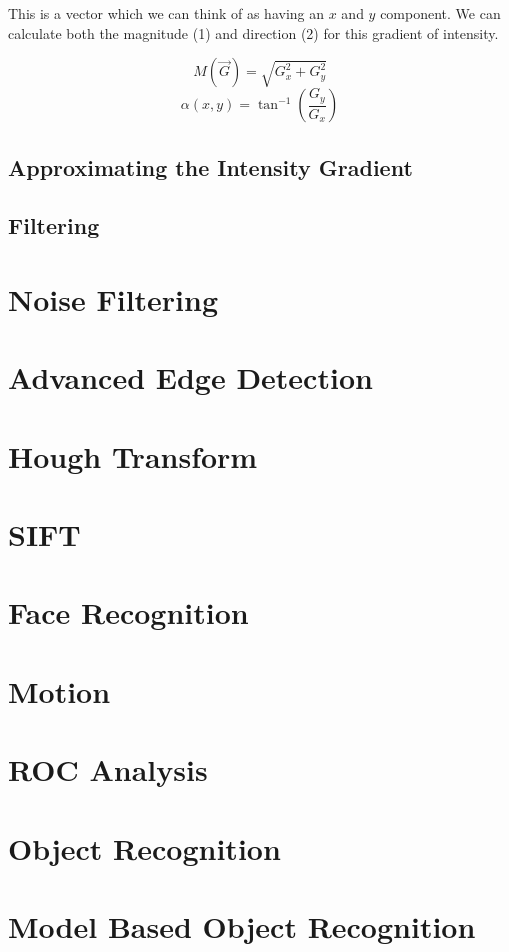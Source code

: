 \documentclass{article}
\begin{document}
	 This is a vector which we can think of as having an $x$ and $y$ component. We can calculate both the magnitude (1) and direction (2) for this gradient of intensity. 
	\begin{multicols}{2}
		\noindent
		\begin{equation}
			M(\overrightarrow{G}) = \sqrt{G_{x}^{2} + G_{y}^{2}}
		\end{equation}
		\begin{equation}
			\alpha(x, y) = \tan^{-1}\left(\frac{G_y}{G_x}\right)
		\end{equation}
	\end{multicols}
	
	\subsection{Approximating the Intensity Gradient}
	
	\subsection{Filtering}
	
	\section{Noise Filtering}

	\section{Advanced Edge Detection}

	\section{Hough Transform}

	\section{SIFT}

	\section{Face Recognition}

	\section{Motion}

	\section{ROC Analysis}

	\section{Object Recognition}

	\section{Model Based Object Recognition}
	\newpage
	\listoffigures
	\printindex
\end{document}
